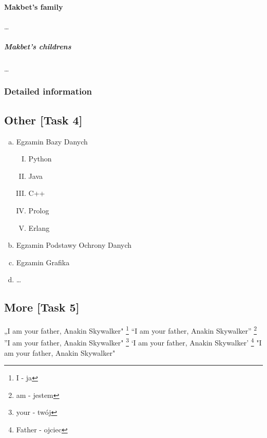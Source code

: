 \documentclass[12pt, letterpaper, twoside]{article}
\begin{document}
\paragraph{Makbet's family}
\ldots
\subparagraph{Makbet's childrens}
\ldots
\subsubsection{Detailed information}

\newpage
\subsection{Other [Task 4]}
\begin{enumerate}[a)]
    \item Egzamin Bazy Danych
\begin{enumerate}[I.]
    \item Python
    \item Java
    \item C++
    \item Prolog
    \item Erlang
    
\end{enumerate}

    \item Egzamin Podstawy Ochrony Danych
    \item Egzamin Grafika
    \item \ldots

\end{enumerate}

\subsection{More [Task 5]}
„I am your father, Anakin Skywalker"
\footnote{I - ja}
\newline
``I am your father, Anakin Skywalker''
\footnote{am - jestem}
\newline
''I am your father, Anakin Skywalker"
\footnote{your - twój}
\newline
`I am your father, Anakin Skywalker'
\footnote{Father - ojciec}
\newline
"I am your father, Anakin Skywalker"
\end{document}
